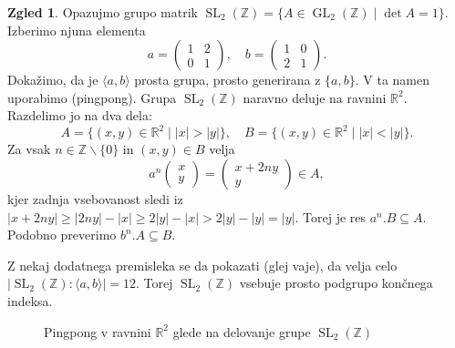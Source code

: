 \documentclass[11pt]{book}
\def\ZZ{\mathbb{Z}}
\def\RR{\mathbb{R}}
\DeclareMathOperator\GL{GL}
\DeclareMathOperator\SL{SL}
\def\literatura{\color{modra}}
\def\vaje{{\literatura (glej vaje)}}
\theoremstyle{definition}
\theoremstyle{zgled}
\newtheorem*{zgled}{Zgled}
\theoremstyle{odprtproblem}
\theoremstyle{domacanaloga}
\theoremstyle{izrek}
\begin{document}
\begin{zgled}
Opazujmo grupo matrik $\SL_2(\ZZ) = \{ A \in \GL_2(\ZZ) \mid \det A = 1 \}$. Izberimo njuna elementa
\[
a = \begin{pmatrix}
1 & 2 \\ 0 & 1
\end{pmatrix},
\quad
b = \begin{pmatrix}
1 & 0 \\ 2 & 1
\end{pmatrix}.
\]
Dokažimo, da je $\langle a, b \rangle$ prosta grupa, prosto generirana z $\{ a, b \}$. V ta namen uporabimo {\sc (pingpong)}. Grupa $\SL_2(\ZZ)$ naravno deluje na ravnini $\RR^2$. Razdelimo jo na dva dela:
\[
A = \{ (x,y) \in \RR^2 \mid |x| > |y| \}, \quad
B = \{ (x,y) \in \RR^2 \mid |x| < |y| \}.
\]
Za vsak $n \in \ZZ \backslash \{ 0 \}$ in $(x,y) \in B$ velja
\[
a^n \begin{pmatrix} x \\ y \end{pmatrix} = \begin{pmatrix} x + 2n y \\ y \end{pmatrix} \in A,
\]
kjer zadnja vsebovanost sledi iz $|x + 2ny| \geq |2ny| - |x| \geq 2 |y| - |x| > 2 |y| - |y| = |y|$. Torej je res $a^n.B \subseteq A$. Podobno preverimo $b^n.A \subseteq B$.

Z nekaj dodatnega premisleka se da pokazati \vaje, da velja celo $|\SL_2(\ZZ) : \langle a,b \rangle| = 12$. Torej $\SL_2(\ZZ)$ vsebuje prosto podgrupo končnega indeksa.
\end{zgled}

\begin{figure}[t]
\centering
{}
\caption{Pingpong v ravnini $\RR^2$ glede na delovanje grupe $\SL_2(\ZZ)$}
\end{figure}
\end{document}
